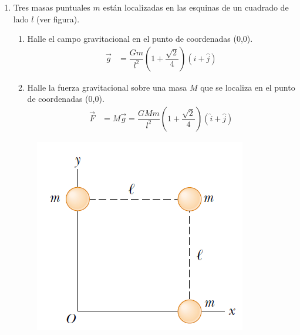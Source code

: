 \documentclass[11pt,twocolumn]{article}
\begin{document}
\begin{enumerate}
\item Tres masas puntuales $m$ están localizadas en las esquinas de un cuadrado de lado $l$ (ver figura). 
\begin{enumerate}
\item Halle el campo gravitacional en el punto de coordenadas (0,0).
\begin{align*}
\vec{g}&=\dfrac{Gm}{l^2}\left(1+\dfrac{\sqrt{2}}{4}\right)\left(\hat{i}+\hat{j}\right)
\end{align*}
\item Halle la fuerza gravitacional sobre una masa $M$ que se localiza en el punto de coordenadas (0,0).
\begin{align*}
\vec{F}&= M\vec{g}=\dfrac{GMm}{l^2}\left(1+\dfrac{\sqrt{2}}{4}\right)\left(\hat{i}+\hat{j}\right)
\end{align*}
\end{enumerate}

\begin{figure}[h]
\centering
\includegraphics[scale=0.5]{fig5}
\end{figure}



\end{enumerate}
\end{document}

